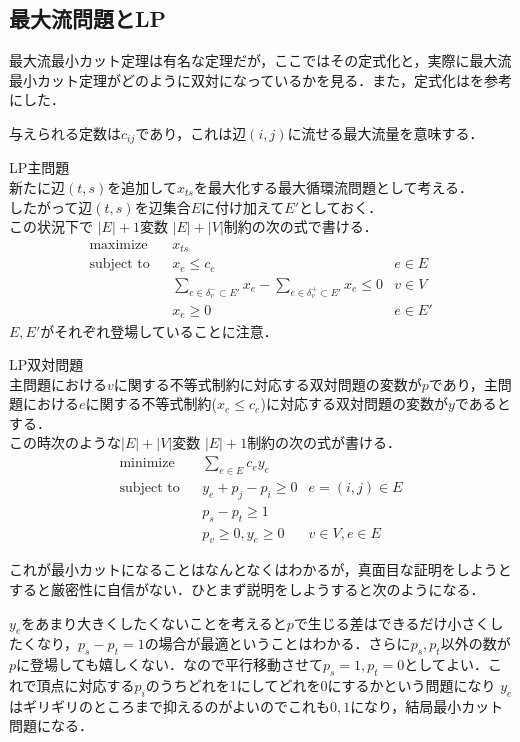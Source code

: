 \documentclass[13pt]{jarticle}
\theoremstyle{nonitalic} %
\begin{document}
\subsection{最大流問題とLP}
最大流最小カット定理は有名な定理だが，ここではその定式化と，実際に最大流最小カット定理がどのように双対になっているかを見る．また，定式化は\cite{kinji}を参考にした．

与えられる定数は$c_{ij}$であり，これは辺$(i,j)$に流せる最大流量を意味する．

LP主問題 \\
新たに辺$(t,s)$を追加して$x_{ts}$を最大化する最大循環流問題として考える． \\
したがって辺$(t,s)$を辺集合$E$に付け加えて$E'$としておく．\\
この状況下で $|E|+1$変数 $|E|+|V|$制約の次の式で書ける．
\begin{align}
 &&&&&\textrm{maximize}   && x_{ts}  \\
 &&&&&\textrm{subject to} && x_e\leq c_e & e \in E  &&&&&\\
 &&&&&                    && \sum_{e \in \delta_v^- \subset E'} x_e - \sum_{e \in \delta_v^+  \subset E'} x_e \leq 0 & v \in V &&&&& \\
 &&&&&                    && x_e \geq 0 & e \in E' &&&&&
\end{align}
$E, E'$がそれぞれ登場していることに注意．


LP双対問題 \\
主問題における$v$に関する不等式制約に対応する双対問題の変数が$p$であり，主問題における$e$に関する不等式制約($x_e \leq c_e$)に対応する双対問題の変数が$y$であるとする．\\
この時次のような$|E|+|V|$変数 $|E|+1$制約の次の式が書ける．
\begin{align}
 &&&&&\textrm{minimize}   && \sum_{e \in E} c_e y_e  \\
 &&&&&\textrm{subject to} && y_e + p_j - p_i \geq 0 &  e = (i, j) \in E  &&&&&\\
 &&&&&                    && p_s - p_t  \geq 1         &&&&& \\
 &&&&&                    && p_v \geq 0,  y_e \geq 0 &  v \in V, e \in E &&&&&
\end{align}

これが最小カットになることはなんとなくはわかるが，真面目な証明をしようとすると厳密性に自信がない．ひとまず説明をしようすると次のようになる．

$y_e$をあまり大きくしたくないことを考えると$p$で生じる差はできるだけ小さくしたくなり，$p_s-p_t=1$の場合が最適ということはわかる．さらに$p_s, p_t$以外の数が$p$に登場しても嬉しくない．なので平行移動させて$p_s=1, p_t=0$としてよい．これで頂点に対応する$p_i$のうちどれを1にしてどれを$0$にするかという問題になり $y_e$ はギリギリのところまで抑えるのがよいのでこれも$0,1$になり，結局最小カット問題になる．
\end{document}
